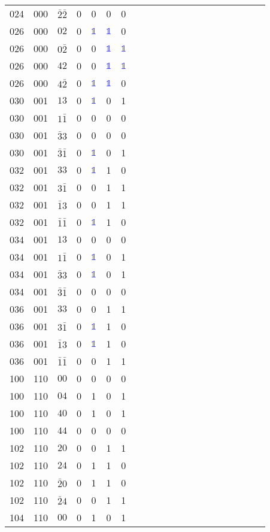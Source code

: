 \begin{longtable*}{c| cccccccccccccccccccc }
024& 000& $\bar{2}\bar{2}$& 0& 0& 0& 0\\
026& 000& $02$& 0& \textcolor{blue}{$\mathds{1}$}& \textcolor{blue}{$\mathds{1}$}& 0\\
026& 000& $0\bar{2}$& 0& 0& \textcolor{blue}{$\mathds{1}$}& \textcolor{blue}{$\mathds{1}$}\\
026& 000& $42$& 0& 0& \textcolor{blue}{$\mathds{1}$}& \textcolor{blue}{$\mathds{1}$}\\
026& 000& $4\bar{2}$& 0& \textcolor{blue}{$\mathds{1}$}& \textcolor{blue}{$\mathds{1}$}& 0\\
030& 001& $13$& 0& \textcolor{blue}{$\mathds{1}$}& 0& 1\\
030& 001& $1\bar{1}$& 0& 0& 0& 0\\
030& 001& $\bar{3}3$& 0& 0& 0& 0\\
030& 001& $\bar{3}\bar{1}$& 0& \textcolor{blue}{$\mathds{1}$}& 0& 1\\
032& 001& $33$& 0& \textcolor{blue}{$\mathds{1}$}& 1& 0\\
032& 001& $3\bar{1}$& 0& 0& 1& 1\\
032& 001& $\bar{1}3$& 0& 0& 1& 1\\
032& 001& $\bar{1}\bar{1}$& 0& \textcolor{blue}{$\mathds{1}$}& 1& 0\\
034& 001& $13$& 0& 0& 0& 0\\
034& 001& $1\bar{1}$& 0& \textcolor{blue}{$\mathds{1}$}& 0& 1\\
034& 001& $\bar{3}3$& 0& \textcolor{blue}{$\mathds{1}$}& 0& 1\\
034& 001& $\bar{3}\bar{1}$& 0& 0& 0& 0\\
036& 001& $33$& 0& 0& 1& 1\\
036& 001& $3\bar{1}$& 0& \textcolor{blue}{$\mathds{1}$}& 1& 0\\
036& 001& $\bar{1}3$& 0& \textcolor{blue}{$\mathds{1}$}& 1& 0\\
036& 001& $\bar{1}\bar{1}$& 0& 0& 1& 1\\
100& 110& $00$& 0& 0& 0& 0\\
100& 110& $04$& 0& 1& 0& 1\\
100& 110& $40$& 0& 1& 0& 1\\
100& 110& $44$& 0& 0& 0& 0\\
102& 110& $20$& 0& 0& 1& 1\\
102& 110& $24$& 0& 1& 1& 0\\
102& 110& $\bar{2}0$& 0& 1& 1& 0\\
102& 110& $\bar{2}4$& 0& 0& 1& 1\\
104& 110& $00$& 0& 1& 0& 1\\

\end{longtable*}
